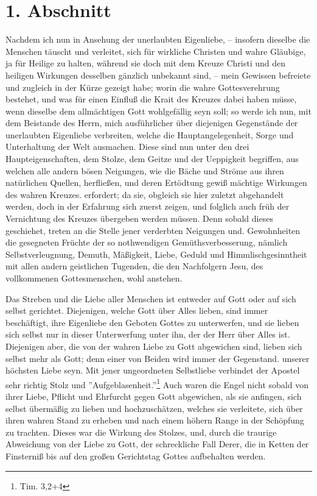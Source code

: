 \section{1. Abschnitt}

Nachdem ich nun in Ansehung der unerlaubten Eigenliebe, -- insofern dieselbe die
Menschen täuscht und verleitet, sich für wirkliche Christen und wahre Gläubige,
ja für Heilige zu halten, während sie doch mit dem Kreuze Christi und den
heiligen Wirkungen desselben gänzlich unbekannt sind, -- mein Gewissen befreiete
und zugleich in der Kürze gezeigt habe; worin die wahre Gottesverehrung
bestehet, und was für einen Einfluß die Krait des Kreuzes dabei haben müsse,
wenn dieselbe dem allmächtigen Gott wohlgefällig seyn soll; so werde ich nun,
mit dem Beistande des Herrn, mich ausführlicher über diejenigen Gegenstände der
unerlaubten Eigenliebe verbreiten, welche die Hauptangelegenheit, Sorge und
Unterhaltung der Welt ausmachen. Diese sind nun unter den drei
Haupteigenschaften, dem Stolze, dem Geitze und der Ueppigkeit begriffen, aus
welchen alle andern bösen Neigungen, wie die Bäche und Ströme aus ihren
natürlichen Quellen, herfließen, und deren Ertödtung gewiß mächtige Wirkungen
des wahren Kreuzes. erfordert; da sie, obgleich sie hier zuletzt abgehandelt
werden, doch in der Erfahrung sich zuerst zeigen, und folglich auch früh der
Vernichtung des Kreuzes übergeben werden müssen. Denn sobald dieses geschiehet,
treten an die Stelle jener verderbten Neigungen und. Gewohnheiten die gesegneten
Früchte der so nothwendigen Gemüthsverbesserung, nämlich Selbstverleugnung,
Demuth, Mäßigkeit, Liebe, Geduld und Himmlischgesinntheit mit allen andern
geistlichen Tugenden, die den Nachfolgern Jesu, des vollkommenen Gottesmenschen,
wohl anstehen.


Das Streben und die Liebe aller Menschen ist entweder auf Gott oder auf sich
selbst gerichtet. Diejenigen, welche Gott über Alles lieben, sind immer
beschäftigt, ihre Eigenliebe den Geboten Gottes zu unterwerfen, und sie lieben
sich selbst nur in dieser Unterwerfung unter ihn, der der Herr über Alles ist.
Diejenigen aber, die von der wahren Liebe zu Gott abgewichen sind, lieben sich
selbst mehr als Gott; denn einer von Beiden wird immer der Gegenstand. unserer
höchsten Liebe seyn. Mit jener ungeordneten Selbstliebe verbindet der Apostel
sehr richtig Stolz und ''Aufgeblasenheit.''\footnote{Tim. 3,2+4} Auch waren die
Engel nicht sobald von ihrer Liebe, Pflicht und Ehrfurcht gegen Gott abgewichen,
als sie anfingen, sich selbst übermäßig zu lieben und hochzuschätzen, welches
sie verleitete, sich über ihren wahren Stand zu erheben und nach einem höhern
Range in der Schöpfung zu trachten. Dieses war die Wirkung des Stolzes, und,
durch die traurige Abweichung von der Liebe zu Gott, der schreckliche Fall
Derer, die in Ketten der Finsterniß bis auf den großen Gerichtstag Gottes
aufbehalten werden.

